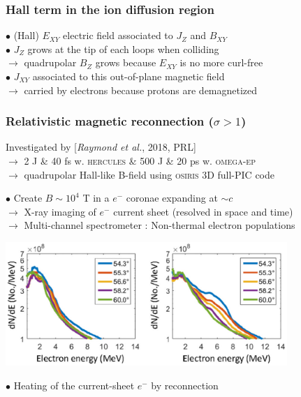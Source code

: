 \documentclass{beamer}
\begin{document}
\begin{frame}
\frametitle{Hall term in the ion diffusion region}

\begin{center}

\end{center}

$\bullet$ (Hall) $E_{XY}$ electric field associated to $J_Z$ and $B_{XY}$ \\[0.3cm]
$\bullet$ $J_Z$ grows at the tip of each loops when colliding\\
$\to$ quadrupolar $B_Z$ grows because $E_{XY}$ is no more curl-free\\[0.3cm]
$\bullet$ $J_{XY}$ associated to this out-of-plane magnetic field\\
$\to$ carried by electrons because protons are demagnetized

\end{frame}



\begin{frame}
\frametitle{Relativistic magnetic reconnection ($\sigma > 1$)}

Investigated by [\textit{Raymond et al.}, 2018, PRL] \\
$\to$ 2 J \& 40 fs w. \textsc{hercules} \& 500 J \& 20 ps w. \textsc{omega-ep} \\
$\to$ quadrupolar Hall-like B-field using \textsc{osiris} 3D full-PIC code \\

\smallskip

$\bullet$ Create $B \sim 10^4$ T in a $e^-$ coronae expanding at $\sim c$ \\

$\to$ X-ray imaging of  $e^-$ current sheet (resolved in space and time) \\
$\to$ Multi-channel spectrometer : Non-thermal electron populations \\

\begin{center}
\includegraphics[width=0.8\textwidth]{raymond2018.png}
\end{center}

$\bullet$ Heating of the current-sheet $e^-$ by reconnection

\end{frame}
\end{document}
